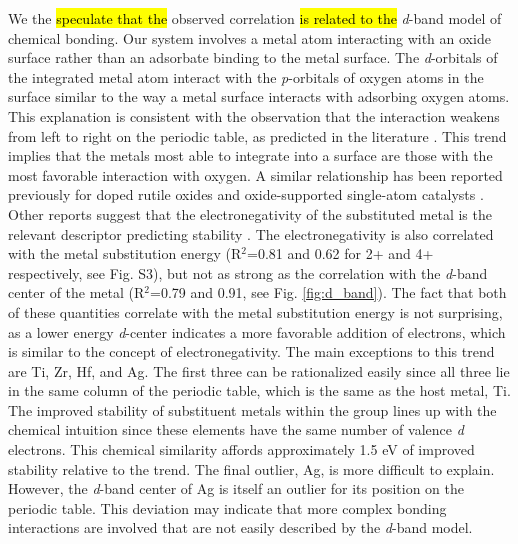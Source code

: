 We the \hl{speculate that the} observed correlation \hl{is related to the} \textit{d}-band model of chemical bonding. Our system involves a metal atom interacting with an oxide surface rather than an adsorbate binding to the metal surface. The \textit{d}-orbitals of the integrated metal atom interact with the \textit{p}-orbitals of oxygen atoms in the surface similar to the way a metal surface interacts with adsorbing oxygen atoms. This explanation is consistent with the observation that the interaction weakens from left to right on the periodic table, as predicted in the literature \cite{Hammer_2000}. This trend implies that the metals most able to integrate into a surface are those with the most favorable interaction with oxygen. A similar relationship has been reported previously for doped rutile oxides \cite{Xu_2015} and oxide-supported single-atom catalysts \cite{O_Connor_2018}. Other reports suggest that the electronegativity of the substituted metal is the relevant descriptor predicting stability \cite{Garc_a_Mota_2011}. The electronegativity is also correlated with the metal substitution energy (R$^2$=0.81 and 0.62 for 2+ and 4+ respectively, see Fig. S3), but not as strong as the correlation with the \textit{d}-band center of the metal (R$^2$=0.79 and 0.91, see Fig. \ref{fig:d_band}). The fact that both of these quantities correlate with the metal substitution energy is not surprising, as a lower energy \textit{d}-center indicates a more favorable addition of electrons, which is similar to the concept of electronegativity. %
The main exceptions to this trend are Ti, Zr, Hf, and Ag. The first three can be rationalized easily since all three lie in the same column of the periodic table, which is the same as the host metal, Ti. The improved stability of substituent metals within the group lines up with the chemical intuition since these elements have the same number of valence \textit{d} electrons. This chemical similarity affords approximately 1.5 eV of improved stability relative to the trend. The final outlier, Ag, is more difficult to explain. However, the \textit{d}-band center of Ag is itself an outlier for its position on the periodic table. This deviation may indicate that more complex bonding interactions are involved that are not easily described by the \textit{d}-band model.

